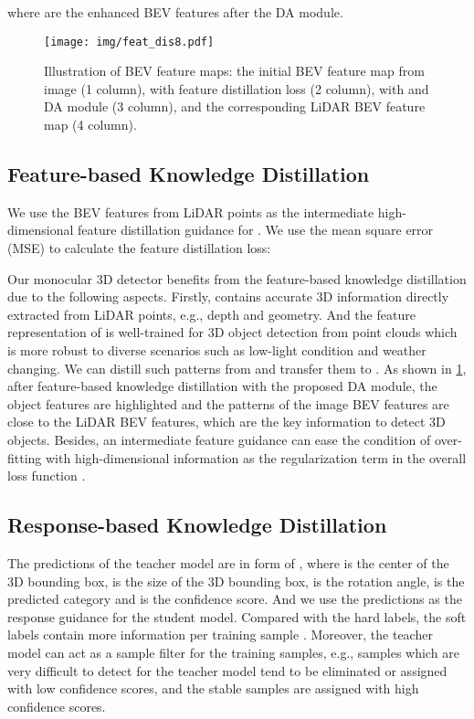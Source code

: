 \documentclass[runningheads]{llncs}
\begin{document}
where  are the enhanced BEV features after the DA module.


\begin{figure}[t]
  \centering
   \texttt{[image: img/feat\_dis8.pdf]}
   \caption{Illustration of BEV feature maps: the initial BEV feature map from image (1 column), with feature distillation loss  (2 column), with  and DA module (3 column), and the corresponding LiDAR BEV feature map (4 column).
}
   \label{fig:featuer distillation}
\end{figure}

\subsection{Feature-based Knowledge Distillation}
We use the BEV features  from LiDAR points as the intermediate high-dimensional feature distillation guidance for .
We use the mean square error (MSE) to calculate the feature distillation loss:

Our monocular 3D detector benefits from the feature-based knowledge distillation due to the following aspects. 
Firstly,  contains accurate 3D information directly extracted from LiDAR points, e.g., depth and geometry.
And the feature representation of  is well-trained for 3D object detection from point clouds which is more robust to diverse scenarios such as low-light condition and weather changing. 
We can distill such patterns from  and transfer them to .
As shown in \cref{fig:featuer distillation}, 
after feature-based knowledge distillation with the proposed DA module, the object features are highlighted and the patterns of the image BEV features are close to the LiDAR BEV features, which are the key information to detect 3D objects.
Besides, an intermediate feature guidance can ease the condition of over-fitting with high-dimensional information as the regularization term in the overall loss function \cite{fitnets,knowledgematters}.

\subsection{Response-based Knowledge Distillation}
The predictions of the teacher model are in form of , where  is the center of the 3D bounding box,  is the size of the 3D bounding box,  is the rotation angle,  is the predicted category and  is the confidence score.
And we use the predictions as the response guidance for the student model.
Compared with the hard labels, the soft labels contain more information per training sample \cite{distilling,sessd}.
Moreover, the teacher model can act as a sample filter for the training samples, e.g., samples which are very difficult to detect for the teacher model tend to be eliminated or assigned with low confidence scores, and the stable samples are assigned with high confidence scores. 
\end{document}
